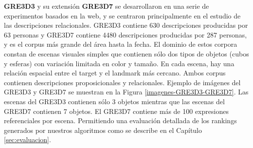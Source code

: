 \label{sec:corpusGRE}

{\bf GRE3D3} y su extensi\'on {\bf GRE3D7} \cite{gre3d3,gre3d7} se desarrollaron en una serie de experimentos basados en la web, y se centraron principalmente en el estudio de las descripciones relacionales. GRE3D3 contiene 630 descripciones producidas por 63 personas y GRE3D7 contiene 4480 descripciones producidas por 287 personas, y es el corpus m\'as grande del \'area hasta la fecha. El dominio de estos corpora constan de escenas visuales simples que contienen s\'olo dos tipos de objetos (cubos y esferas) con variaci\'on limitada en color y tama\~no. En cada escena, hay una relaci\'on espacial entre el target y el landmark m\'as cercano. Ambos corpus contienen descripciones proposicionales y relacionales. Ejemplo de im\'agenes del GRE3D3 y GRE3D7 se muestran en la Figura \ref{imagenes-GRE3D3-GRE3D7}. Las escenas del GRE3D3 contienen s\'olo 3 objetos mientras que las escenas del GRE3D7 contienen 7 objetos. El GRE3D7 contiene m\'as de 100 expresiones referenciales por escena. Permitiendo una evaluaci\'on detallada de los rankings generados por nuestros algoritmos como se describe en el Cap\'itulo \ref{sec:evaluacion}.\\

